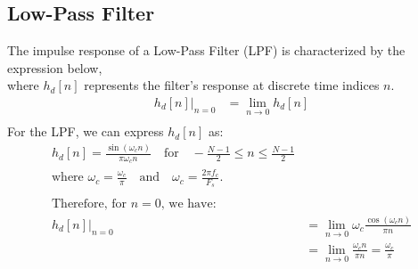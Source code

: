 \documentclass{article}
\begin{document}
\subsection{Low-Pass Filter }

The impulse response of a Low-Pass Filter (LPF) is characterized by the expression below,\\
 where \(h_d[n]\) represents the filter's response at discrete time indices \(n\).
\begin{align}
h_d[n] \bigg|_{n=0} &= \lim_{{n \to 0}} h_d[n] \\
\end{align}
For the LPF, we can express \(h_d[n]\) as:
\begin{align}
h_d[n] = \frac{{\sin(\omega_c n)}}{\pi \omega_c n} \quad \text{for} \quad -\frac{N-1}{2} \leq n \leq \frac{N-1}{2} \nonumber \\
\text{where } \omega_c = \frac{\omega_c}{\pi} \quad \text{and} \quad \omega_c = \frac{2\pi f_c}{F_s}. \nonumber \\
 \\
\text{Therefore, for } n = 0 \text{, we have:} \nonumber \\
h_d[n] \bigg|_{n=0} &= \lim_{{n \to 0}} \omega_c  \frac{{\cos(\omega_c n)}}{\pi n} \nonumber \\
&= \lim_{{n \to 0}} \frac{{\omega_c n}}{{\pi  n}} = \frac{\omega_c}{\pi} \nonumber \\
\end{align}
\end{document}
